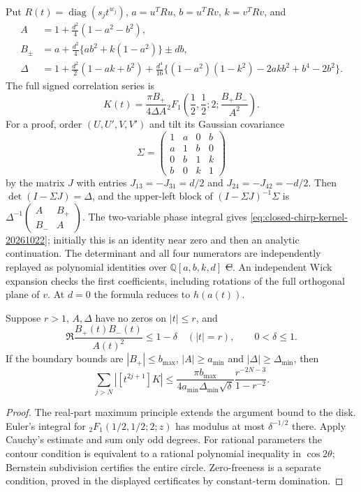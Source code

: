 Put $R(t)=\operatorname{diag}(s_jt^{w_j})$,
$a=u^TRu$, $b=u^TRv$, $k=v^TRv$, and
\begin{align*}
 A&=1+\frac{d^2}{4}(1-a^2-b^2),\\
 B_\pm&=a+\frac{d^2}{4}\{ab^2+k(1-a^2)\}\pm db,\\
 \Delta&=1+\frac{d^2}{2}(1-ak+b^2)
 +\frac{d^4}{16}\{(1-a^2)(1-k^2)-2akb^2+b^4-2b^2\}.
\end{align*}
The full signed correlation series is
\begin{equation}\label{eq:closed-chirp-kernel-20261022}
 K(t)=\frac{\pi B_+}{4\Delta A}
 {}_2F_1\!\left(\frac12,\frac12;2;\frac{B_+B_-}{A^2}\right).
\end{equation}
For a proof, order $(U,U',V,V')$ and tilt its Gaussian covariance
\[
 \Sigma=\begin{pmatrix}1&a&0&b\\a&1&b&0\\0&b&1&k\\b&0&k&1\end{pmatrix}
\]
by the matrix $J$ with entries
$J_{13}=-J_{31}=d/2$ and $J_{24}=-J_{42}=-d/2$.
Then $\det(I-\Sigma J)=\Delta$, and the upper-left block of
$(I-\Sigma J)^{-1}\Sigma$ is
$\Delta^{-1}\left(\begin{smallmatrix}A&B_+\\B_-&A\end{smallmatrix}\right)$.
The two-variable phase integral gives
\eqref{eq:closed-chirp-kernel-20261022}; initially this is an identity
near zero and then an analytic continuation. The determinant and all
four numerators are independently replayed as polynomial identities
over $\mathbb Q[a,b,k,d]$ \st{C}. An independent Wick expansion checks
the first coefficients, including rotations of the full orthogonal
plane of $v$. At $d=0$ the formula reduces to $h(a(t))$.

\begin{proposition}
Suppose $r>1$, $A,\Delta$ have no zeros on $|t|\le r$, and
\[
 \Re\frac{B_+(t)B_-(t)}{A(t)^2}\le1-\delta
 \quad (|t|=r),\qquad 0<\delta\le1.
\]
If the boundary bounds are $|B_+|\le b_{\max}$,
$|A|\ge a_{\min}$ and $|\Delta|\ge\Delta_{\min}$, then
\[
 \sum_{j>N}|[t^{2j+1}]K|
 \le\frac{\pi b_{\max}}{4a_{\min}\Delta_{\min}\sqrt\delta}
       \frac{r^{-2N-3}}{1-r^{-2}}.
\]
\end{proposition}
\begin{proof}
The real-part maximum principle extends the argument bound to the
disk. Euler's integral for ${}_2F_1(1/2,1/2;2;z)$ has modulus at most
$\delta^{-1/2}$ there. Apply Cauchy's estimate and sum only odd degrees.
For rational parameters the contour condition is equivalent to a
rational polynomial inequality in $\cos2\theta$; Bernstein subdivision
certifies the entire circle. Zero-freeness is a separate condition,
proved in the displayed certificates by constant-term domination.
\end{proof}

